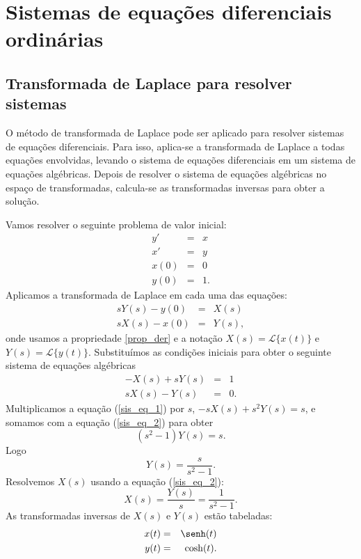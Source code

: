 
\chapter{Sistemas de equações diferenciais ordinárias}
\section{Transformada de Laplace para resolver sistemas}
O método de transformada de Laplace pode ser aplicado para resolver sistemas de equações diferenciais. Para isso, aplica-se a transformada de Laplace a todas equações envolvidas, levando o sistema de equações diferenciais em um sistema de equações algébricas. Depois de resolver o sistema de equações algébricas no espaço de transformadas, calcula-se as transformadas inversas para obter a solução.
\begin{ex}Vamos resolver o seguinte problema de valor inicial:
\begin{eqnarray*}
y'&=&x\\
x'&=&y\\
x(0)&=&0\\
y(0)&=&1.
\end{eqnarray*}
Aplicamos a transformada de Laplace em cada uma das equações:
\begin{eqnarray*}
sY(s)-y(0)&=&X(s)\\
sX(s)-x(0)&=&Y(s),
\end{eqnarray*}
onde usamos a propriedade \ref{prop_der} e a notação $X(s)=\mathcal{L}\{x(t)\}$ e $Y(s)=\mathcal{L}\{y(t)\}$. Substituímos as condições iniciais para obter o seguinte sistema de equações algébricas
\begin{eqnarray}
\label{sis_eq_1}-X(s)+sY(s)&=&1\\
\label{sis_eq_2} sX(s)-Y(s)&=&0.
\end{eqnarray}
Multiplicamos a equação (\ref{sis_eq_1}) por $s$, $-sX(s)+s^2Y(s)=s$, e somamos com a equação (\ref{sis_eq_2}) para obter
\begin{equation}
(s^2-1)Y(s)=s.
\end{equation}
Logo
\begin{equation}
Y(s)=\frac{s}{s^2-1}.
\end{equation}
Resolvemos $X(s)$ usando a equação (\ref{sis_eq_2}):
\begin{equation}
X(s)=\frac{Y(s)}{s}=\frac{1}{s^2-1}.
\end{equation}
As transformadas inversas de $X(s)$ e $Y(s)$ estão tabeladas:
\begin{eqnarray*}
x(t)&=&\senh(t)\\
y(t)&=&\cosh(t).
\end{eqnarray*}
\end{ex}
